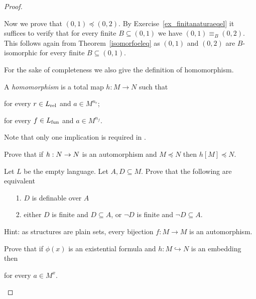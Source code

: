 \begin{proof}
\begin{example}
Now we prove that $(0,1)\preceq (0,2)$.
By Exercise~\ref{ex_finitanaturaeqel} it suffices to verify that for every finite $B\subseteq(0,1)$ we have $(0,1)\equiv_B  (0,2)$.
This follows again from Theorem~\ref{isomorfoeleq} as $(0,1)$ and $(0,2)$ are $B$-isomorphic for every finite $B\subseteq(0,1)$.
\end{example}


For the sake of completeness we also give the definition of homomorphism.

\begin{definition}\label{def_homomorphism}
A \emph{homomorphism} is a total map $h:M\to N$ such that

\qquad for every $r\in L_{\rm rel}$ and $a\in M^{n_r}$;\smallskip\par

\qquad  for every $f\in L_{\rm fun}$ and $a\in M^{n_f}$.

Note that only one implication is required in .
\end{definition}

\begin{exercise}
Prove that if $h:N\rightarrow N$ is an automorphism and $M\preceq N$ then $h[M]\preceq N$.
\end{exercise}

\begin{exercise}
Let $L$ be the empty language.
Let $A,D\subseteq M$.
Prove that the following are equivalent
\begin{itemize}
 \item[1.] $D$ is definable over $A$
 \item[2.] either $D$ is finite and $D\subseteq A$, or $\neg D$ is finite and $\neg D\subseteq A$.
\end{itemize}
Hint: as structures are plain sets, every bijection $f:M\to M$ is an automorphism.
\end{exercise}

\begin{exercise}\label{dlorlkurb}
Prove that if $\phi(x)$ is an existential formula and $h:M\hookrightarrow N$ is an embedding then

\hfill for every $a\in M^x$.


\end{exercise}
\end{proof}
